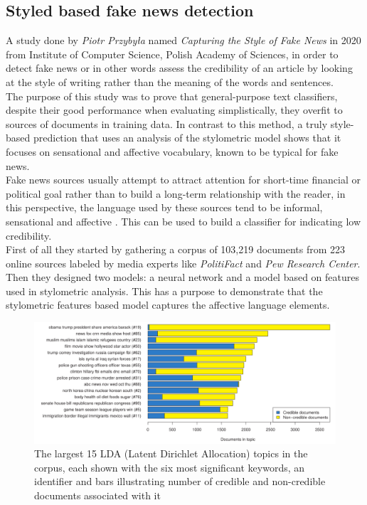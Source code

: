 \documentclass[conference]{IEEEtran}
\begin{document}
\begin{appendices}
\subsection{Styled based fake news detection \cite{przybyla2020capturing}}
A study done by \textit{Piotr Przybyła} named \textit{Capturing the Style of Fake News} in 2020 from Institute of Computer Science, Polish Academy of Sciences, in order to detect fake news or in other words assess the credibility of an article by looking at the style of writing rather than the meaning of the words and sentences.\\
The purpose of this study was to prove that general-purpose text classifiers, despite their good performance when evaluating simplistically, they overfit to sources of documents in training data. In contrast to this method, a truly style-based prediction that uses an analysis of the stylometric model shows that it focuses on sensational and affective vocabulary, known to be typical for fake news.\\

Fake news sources usually attempt to attract attention for short-time financial or political goal \cite{allcott2017social} rather than to build a long-term relationship with the reader, in this perspective, the language used by these sources tend to be informal, sensational and affective \cite{bakir2017fake}. This can be used to build a classifier for indicating low credibility.\\

First of all they started by gathering a corpus of 103,219 documents from 223 online sources labeled by media experts like \textit{PolitiFact} and \textit{Pew Research Center}. Then they designed two models: a neural network and a model based on features used in stylometric analysis. This has a purpose to demonstrate that the stylometric features based model captures the affective language elements.\\

\begin{figure}[htp]
	\centering
	\includegraphics[scale=0.4]{documents_in_topic.png}
	\caption{The largest 15 LDA (Latent Dirichlet Allocation) topics in the corpus, each shown with the six most signiﬁcant keywords, an identiﬁer and bars illustrating number of credible and non-credible documents associated with it \cite{przybyla2020capturing}}
\end{figure}


\end{appendices}
\end{document}
